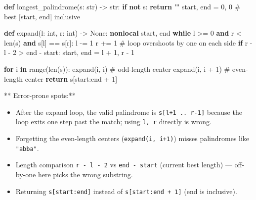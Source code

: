 \documentclass[11pt]{article}
\providecommand{\tightlist}{\setlength{\itemsep}{1pt}\setlength{\parskip}{0pt}}
\newenvironment{Shaded}{\begin{snugshade}}{\end{snugshade}}
\newcommand{\BuiltInTok}[1]{\textcolor[rgb]{0.50,0.55,0.55}{#1}}
\newcommand{\CommentTok}[1]{\textcolor[rgb]{0.48,0.49,0.49}{#1}}
\newcommand{\ControlFlowTok}[1]{\textcolor[rgb]{0.99,0.74,0.29}{\textbf{#1}}}
\newcommand{\DecValTok}[1]{\textcolor[rgb]{0.96,0.45,0.00}{#1}}
\newcommand{\KeywordTok}[1]{\textcolor[rgb]{0.81,0.81,0.76}{\textbf{#1}}}
\newcommand{\NormalTok}[1]{\textcolor[rgb]{0.81,0.81,0.76}{#1}}
\newcommand{\OperatorTok}[1]{\textcolor[rgb]{0.81,0.81,0.76}{#1}}
\newcommand{\StringTok}[1]{\textcolor[rgb]{0.96,0.31,0.31}{#1}}
\newcommand{\VariableTok}[1]{\textcolor[rgb]{0.15,0.68,0.68}{#1}}
\begin{document}
\begin{Shaded}
\begin{Highlighting}[]
\KeywordTok{def}\NormalTok{ longest\_palindrome(s: }\BuiltInTok{str}\NormalTok{) }\OperatorTok{{-}\textgreater{}} \BuiltInTok{str}\NormalTok{:}
    \ControlFlowTok{if} \KeywordTok{not}\NormalTok{ s:}
        \ControlFlowTok{return} \StringTok{""}
\NormalTok{    start, end }\OperatorTok{=} \DecValTok{0}\NormalTok{, }\DecValTok{0}              \CommentTok{\# best [start, end] inclusive}

    \KeywordTok{def}\NormalTok{ expand(l: }\BuiltInTok{int}\NormalTok{, r: }\BuiltInTok{int}\NormalTok{) }\OperatorTok{{-}\textgreater{}} \VariableTok{None}\NormalTok{:}
        \KeywordTok{nonlocal}\NormalTok{ start, end}
        \ControlFlowTok{while}\NormalTok{ l }\OperatorTok{\textgreater{}=} \DecValTok{0} \KeywordTok{and}\NormalTok{ r }\OperatorTok{\textless{}} \BuiltInTok{len}\NormalTok{(s) }\KeywordTok{and}\NormalTok{ s[l] }\OperatorTok{==}\NormalTok{ s[r]:}
\NormalTok{            l }\OperatorTok{{-}=} \DecValTok{1}
\NormalTok{            r }\OperatorTok{+=} \DecValTok{1}
        \CommentTok{\# loop overshoots by one on each side}
        \ControlFlowTok{if}\NormalTok{ r }\OperatorTok{{-}}\NormalTok{ l }\OperatorTok{{-}} \DecValTok{2} \OperatorTok{\textgreater{}}\NormalTok{ end }\OperatorTok{{-}}\NormalTok{ start:}
\NormalTok{            start, end }\OperatorTok{=}\NormalTok{ l }\OperatorTok{+} \DecValTok{1}\NormalTok{, r }\OperatorTok{{-}} \DecValTok{1}

    \ControlFlowTok{for}\NormalTok{ i }\KeywordTok{in} \BuiltInTok{range}\NormalTok{(}\BuiltInTok{len}\NormalTok{(s)):}
\NormalTok{        expand(i, i)              }\CommentTok{\# odd{-}length center}
\NormalTok{        expand(i, i }\OperatorTok{+} \DecValTok{1}\NormalTok{)          }\CommentTok{\# even{-}length center}
    \ControlFlowTok{return}\NormalTok{ s[start:end }\OperatorTok{+} \DecValTok{1}\NormalTok{]}
\end{Highlighting}
\end{Shaded}

** Error-prone spots:**

\begin{itemize}
\tightlist
\item
  After the expand loop, the valid palindrome is \texttt{s{[}l+1\ ..\ r-1{]}} because the loop exits one step past the match; using \texttt{l,\ r} directly is wrong.
\item
  Forgetting the even-length centers (\texttt{expand(i,\ i+1)}) misses palindromes like \texttt{"abba"}.
\item
  Length comparison \texttt{r\ -\ l\ -\ 2} vs \texttt{end\ -\ start} (current best length) --- off-by-one here picks the wrong substring.
\item
  Returning \texttt{s{[}start:end{]}} instead of \texttt{s{[}start:end\ +\ 1{]}} (end is inclusive).
\end{itemize}
\end{document}
